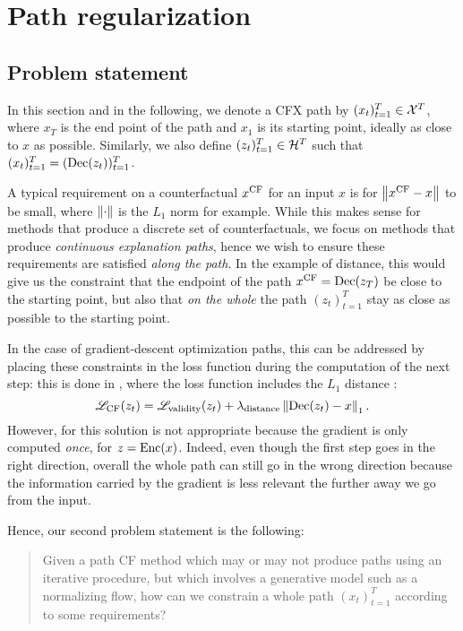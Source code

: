 \documentclass[../main.tex]{subfiles}
\begin{document}
\section{Path regularization}

\subsection{Problem statement}

In this section and in the following, we denote a CFX path by $(x_t)_{t=1}^T \in \mathcal{X}^T$, where $x_T$ is the end point of the path and
$x_1$ is its starting point, ideally as close to $x$ as possible.
Similarly, we also define $(z_t)_{t=1}^T \in \mathcal{H}^T$ such that $(x_t)_{t=1}^T = (\operatorname{Dec}(z_t))_{t=1}^T$.

A typical requirement on a counterfactual $x^\mathrm{CF}$ for an input $x$ is for $\left\lVert x^\mathrm{CF} - x\right\rVert$ to be small, where $\left\lVert\cdot\right\rVert$ is the $L_1$ norm for example.
While this makes sense for methods that produce a discrete set of counterfactuals, we focus on methods that produce \emph{continuous explanation paths}, hence we wish to ensure these requirements are satisfied \emph{along the path}.
In the example of distance, this would give us the constraint that the endpoint of the path $x^\mathrm{CF} = \operatorname{Dec}(z_T)$ be close to the starting point, but also that \emph{on the whole} the path $(z_t)_{t=1}^T$ stay as close as possible to the starting point.

In the case of gradient-descent optimization paths, this can be addressed by placing these constraints in the loss function during the computation of the next step: this is done in \revise{}, where the loss function includes the $L_1$ distance \cite{joshiRealistic2019}:
\begin{equation*}
\mathscr{L}_\text{CF}(z_t) = \mathscr{L}_\text{validity}(z_t) + \lambda_\text{distance} \left\lVert\operatorname{Dec}(z_t) - x\right\rVert_1.
\end{equation*}
However, for \ls{} this solution is not appropriate because the gradient is only computed \emph{once}, for $z = \operatorname{Enc}(x)$.
Indeed, even though the first step goes in the right direction, overall the whole path can still go in the wrong direction because the information carried by the gradient is less relevant the further away we go from the input.

Hence, our second problem statement is the following:
\begin{quote}
Given a path CF method which may or may not produce paths using an iterative procedure, but which involves a generative model such as a normalizing flow,
how can we constrain a whole path $(x_t)_{t=1}^T$ according to some requirements?
\end{quote}
\end{document}
